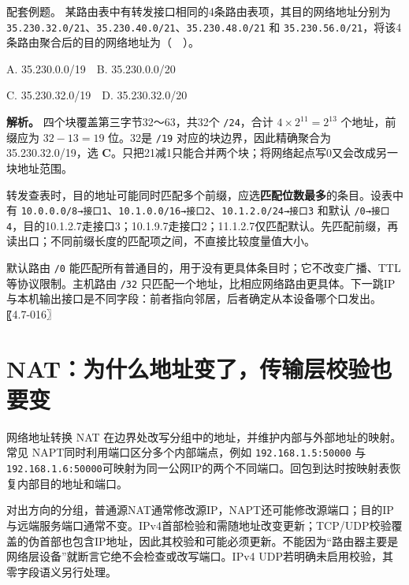 \begin{example}[配套例题]

配套例题。 某路由表中有转发接口相同的4条路由表项，其目的网络地址分别为 \texttt{35.230.32.0/\allowbreak{}21}、\texttt{35.230.40.0/\allowbreak{}21}、\texttt{35.230.48.0/\allowbreak{}21} 和 \texttt{35.230.56.0/\allowbreak{}21}，将该4条路由聚合后的目的网络地址为（　）。

A. 35.230.0.0/19　B. 35.230.0.0/20

C. 35.230.32.0/19　D. 35.230.32.0/20

\end{example}

\textbf{解析。} 四个块覆盖第三字节32～63，共32个 \texttt{/\allowbreak{}24}，合计 \(4\times2^{11}=2^{13}\) 个地址，前缀应为 \(32-13=19\) 位。32是 \texttt{/\allowbreak{}19} 对应的块边界，因此精确聚合为35.230.32.0/19，选 \textbf{C}。只把21减1只能合并两个块；将网络起点写0又会改成另一块地址范围。

转发查表时，目的地址可能同时匹配多个前缀，应选\textbf{匹配位数最多}的条目。设表中有 \texttt{10.0.0.0/\allowbreak{}8→接口1}、\texttt{10.1.0.0/\allowbreak{}16→接口2}、\texttt{10.1.2.0/\allowbreak{}24→接口3} 和默认 \texttt{/\allowbreak{}0→接口4}，目的10.1.2.7走接口3；10.1.9.7走接口2；11.1.2.7仅匹配默认。先匹配前缀，再读出口；不同前缀长度的匹配项之间，不直接比较度量值大小。

默认路由 \texttt{/\allowbreak{}0} 能匹配所有普通目的，用于没有更具体条目时；它不改变广播、TTL等协议限制。主机路由 \texttt{/\allowbreak{}32} 只匹配一个地址，比相应网络路由更具体。下一跳IP与本机输出接口是不同字段：前者指向邻居，后者确定从本设备哪个口发出。〖4.7-016〗

\section{NAT：为什么地址变了，传输层校验也要变}\label{CN04-10}

网络地址转换 NAT 在边界处改写分组中的地址，并维护内部与外部地址的映射。常见 NAPT同时利用端口区分多个内部端点，例如 \texttt{192.168.1.5:\allowbreak{}50000} 与 \texttt{192.168.1.6:\allowbreak{}50000}可映射为同一公网IP的两个不同端口。回包到达时按映射表恢复内部目的地址和端口。

对出方向的分组，普通源NAT通常修改源IP，NAPT还可能修改源端口；目的IP与远端服务端口通常不变。IPv4首部检验和需随地址改变更新；TCP/UDP校验覆盖的伪首部也包含IP地址，因此其校验和可能必须更新。不能因为``路由器主要是网络层设备''就断言它绝不会检查或改写端口。IPv4 UDP若明确未启用校验，其零字段语义另行处理。

